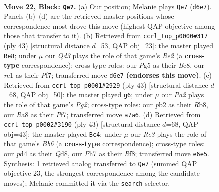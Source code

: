 \documentclass[11pt]{article}
\begin{document}
\clearpage

\begin{figure}[p]\centering
\begin{subfigure}{0.46\textwidth}\centering
\resizebox{\linewidth}{!}{%
\newchessgame
\chessboard[
  setfen={r1b5/pp1n2kp/2pqr1p1/6p1/2BPN3/5PP1/PP3K1P/2RQR3 b - - 0 22},
  showmover=false,
  pgfstyle=straightmove, color=movearrow, markmove={d6-e7}
]}
\caption{}
\end{subfigure}\hfill
\begin{subfigure}{0.46\textwidth}\centering
\resizebox{\linewidth}{!}{%
\newchessgame
\chessboard[
  setfen={r1b3k1/1p2rpp1/2p2n1p/4q3/1P1N4/2Q1P2P/4BPP1/2RR2K1 b - - 2 22},
  showmover=false,
  pgfstyle=straightmove, color=movearrow, markmove={e7-e8}
]}
\caption{}
\end{subfigure}
\\[4pt]
\begin{subfigure}{0.46\textwidth}\centering
\resizebox{\linewidth}{!}{%
\newchessgame
\chessboard[
  setfen={1r2r1k1/1b3ppp/p3nq2/3p4/1PpN4/P3P2P/1Q2BPP1/2RR2K1 b - - 7 22},
  showmover=false,
  pgfstyle=straightmove, color=movearrow, markmove={g7-g6}
]}
\caption{}
\end{subfigure}\hfill
\begin{subfigure}{0.46\textwidth}\centering
\resizebox{\linewidth}{!}{%
\newchessgame
\chessboard[
  setfen={3q1rk1/2p2ppp/1p6/r1npP3/P4P2/BbN1P3/5QPP/RR4K1 b - - 6 22},
  showmover=false,
  pgfstyle=straightmove, color=movearrow, markmove={b3-c4}
]}
\caption{}
\end{subfigure}
\caption{\textbf{Move 22, Black: \texttt{Qe7}.} (a) Our position; Melanie plays \texttt{Qe7} (\texttt{d6e7}). Panels (b)--(d) are the retrieved master positions whose correspondence most drove this move (highest QAP objective among those that transfer to it). (b) Retrieved from \texttt{ccrl\_top\_p0000\#317} (ply 43) [structural distance $d$=53, QAP obj=23]: the master played \texttt{Re8}; under $\mu$ our \emph{Qd3} plays the role of that game's \emph{Re2} (a \textbf{cross-type} correspondence); cross-type roles: our \emph{P}g5 as their \emph{B}c8, our \emph{r}c1 as their \emph{P}f7; transferred move \texttt{d6e7} \textbf{(endorses this move)}. (c) Retrieved from \texttt{ccrl\_top\_p0001\#2929} (ply 43) [structural distance $d$=68, QAP obj=50]: the master played \texttt{g6}; under $\mu$ our \emph{Pa2} plays the role of that game's \emph{Pg2}; cross-type roles: our \emph{p}b2 as their \emph{R}b8, our \emph{R}a8 as their \emph{P}f7; transferred move \texttt{a7a6}. (d) Retrieved from \texttt{ccrl\_top\_p0002\#3190} (ply 43) [structural distance $d$=68, QAP obj=43]: the master played \texttt{Bc4}; under $\mu$ our \emph{Re3} plays the role of that game's \emph{Bb6} (a \textbf{cross-type} correspondence); cross-type roles: our \emph{p}d4 as their \emph{Q}d8, our \emph{P}h7 as their \emph{R}f8; transferred move \texttt{e6e5}. Synthesis: 1 retrieved analog transferred to \texttt{Qe7} (summed QAP objective 23, the strongest correspondence among the candidate moves); Melanie committed it via the \texttt{search} selector.}
\label{fig:thought-m43}
\end{figure}
\end{document}
